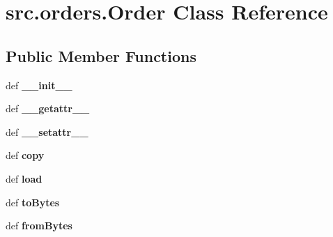 \hypertarget{classsrc_1_1orders_1_1_order}{\section{src.\-orders.\-Order \-Class \-Reference}
\label{classsrc_1_1orders_1_1_order}
}
\subsection*{\-Public \-Member \-Functions}
\begin{DoxyCompactItemize}
\item 
\hypertarget{classsrc_1_1orders_1_1_order_ac1fbb5b5c8f81d1e203e478eec1a29fb}{def {\bfseries \-\_\-\-\_\-init\-\_\-\-\_\-}}\label{classsrc_1_1orders_1_1_order_ac1fbb5b5c8f81d1e203e478eec1a29fb}

\item 
\hypertarget{classsrc_1_1orders_1_1_order_a64e9fbf0310096a6532057f1b9d05c5a}{def {\bfseries \-\_\-\-\_\-getattr\-\_\-\-\_\-}}\label{classsrc_1_1orders_1_1_order_a64e9fbf0310096a6532057f1b9d05c5a}

\item 
\hypertarget{classsrc_1_1orders_1_1_order_abde48245d90eebc476ddf27ebc2c73d1}{def {\bfseries \-\_\-\-\_\-setattr\-\_\-\-\_\-}}\label{classsrc_1_1orders_1_1_order_abde48245d90eebc476ddf27ebc2c73d1}

\item 
\hypertarget{classsrc_1_1orders_1_1_order_a97a7c5d09e2acccc49fb015e518738b8}{def {\bfseries copy}}\label{classsrc_1_1orders_1_1_order_a97a7c5d09e2acccc49fb015e518738b8}

\item 
\hypertarget{classsrc_1_1orders_1_1_order_a04d6d02084832b8e7e0d977cb333eab1}{def {\bfseries load}}\label{classsrc_1_1orders_1_1_order_a04d6d02084832b8e7e0d977cb333eab1}

\item 
\hypertarget{classsrc_1_1orders_1_1_order_aa48ef819154770b19b524b534283c183}{def {\bfseries to\-Bytes}}\label{classsrc_1_1orders_1_1_order_aa48ef819154770b19b524b534283c183}

\item 
\hypertarget{classsrc_1_1orders_1_1_order_a727cb258b2f5d787d02eec14523f9f6b}{def {\bfseries from\-Bytes}}\label{classsrc_1_1orders_1_1_order_a727cb258b2f5d787d02eec14523f9f6b}

\end{DoxyCompactItemize}
